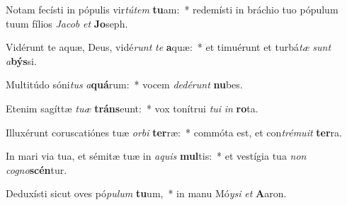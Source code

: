 \item Notam fecísti in pópulis vir\textit{tú}\textit{tem} \textbf{tu}am:~* redemísti in bráchio tuo pópulum tuum fílios \textit{Ja}\textit{cob} \textit{et} \textbf{Jo}seph.
\item Vidérunt te aquæ, Deus, vidé\textit{runt} \textit{te} \textbf{a}quæ:~* et timuérunt et turbá\textit{tæ} \textit{sunt} \textit{a}\textbf{býs}si.
\item Multitúdo sóni\textit{tus} \textit{a}\textbf{quá}rum:~* vocem \textit{de}\textit{dé}\textit{runt} \textbf{nu}bes.
\item Etenim sagíttæ \textit{tu}\textit{æ} \textbf{tráns}eunt:~* vox tonítrui \textit{tu}\textit{i} \textit{in} \textbf{ro}ta.
\item Illuxérunt coruscatiónes tuæ \textit{or}\textit{bi} \textbf{ter}ræ:~* commóta est, et con\textit{tré}\textit{mu}\textit{it} \textbf{ter}ra.
\item In mari via tua, et sémitæ tuæ in \textit{a}\textit{quis} \textbf{mul}tis:~* et vestígia tua \textit{non} \textit{co}\textit{gno}\textbf{scén}tur.
\item Deduxísti sicut oves pó\textit{pu}\textit{lum} \textbf{tu}um,~* in manu Mó\textit{y}\textit{si} \textit{et} \textbf{A}aron.
